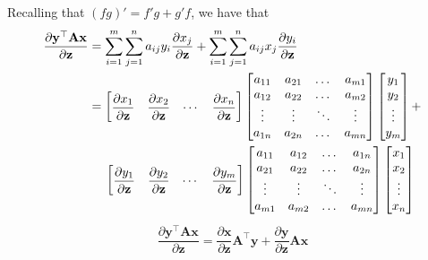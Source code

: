 \documentclass{article}
\newcommand{\trans}{\top}
\begin{document}
Recalling that \((fg)' = f'g + g'f\), we have that
\begin{align}
    \dfrac{\partial \mathbf{y}^\trans \mathbf{A} \mathbf{x}}{\partial \mathbf{z}} & = \sum_{i = 1}^{m}\sum_{j = 1}^{n} a_{ij} y_{i} \dfrac{\partial x_{j}}{\partial \mathbf{z}} + \sum_{i = 1}^{m}\sum_{j = 1}^{n} a_{ij} x_{j} \dfrac{\partial y_{i}}{\partial \mathbf{z}} \\
    & = \begin{bmatrix}
        \dfrac{\partial x_1}{\partial \mathbf{z}} & \dfrac{\partial x_2}{\partial \mathbf{z}} & \cdots & \dfrac{\partial x_n}{\partial \mathbf{z}}
    \end{bmatrix}
    \begin{bmatrix}
        a_{11} & a_{21} & \dots & a_{m1} \\
        a_{12} & a_{22} & \dots & a_{m2} \\
        \vdots & \vdots & \ddots & \vdots \\
        a_{1n} & a_{2n} & \dots & a_{mn} \\
    \end{bmatrix}
    \begin{bmatrix}
        y_1 \\
        y_2 \\
        \vdots \\
        y_m
    \end{bmatrix} + \\
    & \hspace{3ex} \begin{bmatrix}
        \dfrac{\partial y_1}{\partial \mathbf{z}} & \dfrac{\partial y_2}{\partial \mathbf{z}} & \cdots & \dfrac{\partial y_m}{\partial \mathbf{z}}
    \end{bmatrix}
    \begin{bmatrix}
        a_{11} & a_{12} & \dots & a_{1n} \\
        a_{21} & a_{22} & \dots & a_{2n} \\
        \vdots & \vdots & \ddots & \vdots \\
        a_{m1} & a_{m2} & \dots & a_{mn} \\
    \end{bmatrix}
    \begin{bmatrix}
        x_1 \\
        x_2 \\
        \vdots \\
        x_n
    \end{bmatrix}
\end{align}
\begin{align}
    \boxed{\dfrac{\partial \mathbf{y}^\trans \mathbf{A} \mathbf{x}}{\partial \mathbf{z}} = \dfrac{\partial \mathbf{x}}{\partial \mathbf{z}} \mathbf{A}^{\trans} \mathbf{y} + \dfrac{\partial \mathbf{y}}{\partial \mathbf{z}} \mathbf{A} \mathbf{x}}
\end{align}
\end{document}
